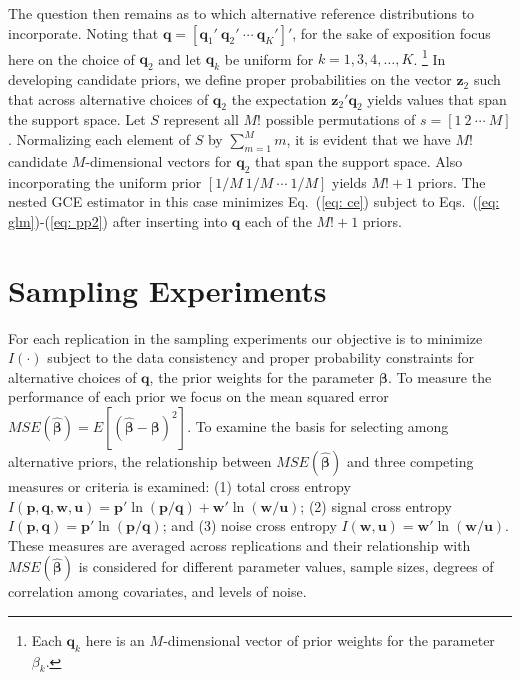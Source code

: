 \documentclass[english]{article}
\begin{document}
The question then remains as to which alternative reference distributions to 
incorporate.
Noting that $\mathbf{q}=[\mathbf{q}_1' ~ \mathbf{q}_2' ~ 
\cdots ~ \mathbf{q}_K' ]'$, for the sake of exposition focus here on the 
choice of $\mathbf{q}_2$ and let $\mathbf{q}_k$ be uniform for 
$k=1,3,4,\ldots, K$.%
\footnote{Each $\mathbf{q}_k$ here is an $M$-dimensional vector of 
 prior weights for the parameter $\beta_k$.}
In developing candidate priors, we define proper probabilities on the vector 
$\mathbf{z}_2$ such that across alternative choices of $\mathbf{q}_2$ the 
expectation $\mathbf{z}_2'\mathbf{q}_2$  yields values that span the 
support space. 
Let $S$ represent all  $M!$ possible permutations of 
$s = [1 ~ 2 ~ \cdots ~ M]$.
Normalizing each element of $S$ by $\sum_{m=1}^M m$, it is evident
that we have $M!$ candidate $M$-dimensional vectors for 
$\mathbf{q}_2$ that span the support space. 
Also incorporating the uniform prior $[1/M ~ 1/M ~ \cdots ~ 1/M]$ yields 
$M! + 1$ priors.
The nested GCE estimator in this case minimizes Eq.\ (\ref{eq: ce}) subject 
to Eqs.\ (\ref{eq: glm})-(\ref{eq: pp2}) after inserting into $\mathbf{q}$ 
each of the $M! + 1$ priors.


\section{Sampling Experiments}
\label{sec: mce}

For each replication in the sampling experiments our objective is to minimize 
$I(\cdot)$ subject to the data consistency and proper probability constraints 
for alternative choices of $\mathbf{q}$, the prior weights for the parameter 
$\mathbf{\beta}$. 
To measure the performance of each prior we focus on the mean squared 
error $MSE(\hat{\mathbf{\beta}}) = E[(\hat{\mathbf{\beta}}- 
\mathbf{\beta})^2]$.
To examine the basis for selecting among alternative priors, the 
relationship between $MSE(\hat{\mathbf{\beta}})$ and three competing 
measures or criteria is examined: (1) total cross entropy $I({\mathbf{p}, 
\mathbf{q}, \mathbf{w}, \mathbf{u}}) = 
\mathbf{p}' \ln (\mathbf{p}/\mathbf{q}) 
+ \mathbf{w}' \ln (\mathbf{w}/\mathbf{u})$; (2) signal cross entropy 
$I(\mathbf{p}, \mathbf{q})= \mathbf{p}' \ln (\mathbf{p}/\mathbf{q})$;
and (3) noise cross entropy $I(\mathbf{w}, \mathbf{u}) = 
\mathbf{w}' \ln (\mathbf{w}/\mathbf{u})$.
These measures are averaged across replications and their relationship with $MSE(\hat{\mathbf{\beta}})$ is considered for different parameter values, 
sample sizes, degrees of correlation among covariates, and levels of noise.
\end{document}
